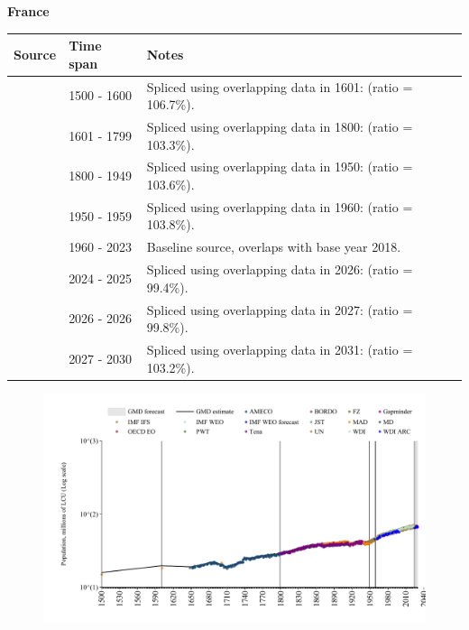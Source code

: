 \documentclass[12pt,a4paper,landscape]{article}
\begin{document}
\begin{adjustbox}{max totalsize={\paperwidth}{\paperheight},center}
\begin{minipage}[t][\textheight][t]{\textwidth}
\vspace*{0.5cm}
{}
\begin{center}
{\Large\bfseries France}
\end{center}
\vspace{0.5cm}
\begin{table}[H]
\centering
\small
\begin{tabular}{|l|l|l|}
\hline
\textbf{Source} & \textbf{Time span} & \textbf{Notes} \\
\hline
\rowcolor{white}\cite{MAD}& 1500 - 1600 &Spliced using overlapping data in 1601: (ratio = 106.7\%).\\
\rowcolor{lightgray}\cite{MD}& 1601 - 1799 &Spliced using overlapping data in 1800: (ratio = 103.3\%).\\
\rowcolor{white}\cite{Gapminder}& 1800 - 1949 &Spliced using overlapping data in 1950: (ratio = 103.6\%).\\
\rowcolor{lightgray}\cite{IMF_IFS}& 1950 - 1959 &Spliced using overlapping data in 1960: (ratio = 103.8\%).\\
\rowcolor{white}\cite{WDI}& 1960 - 2023 &Baseline source, overlaps with base year 2018.\\
\rowcolor{lightgray}\cite{OECD_EO}& 2024 - 2025 &Spliced using overlapping data in 2026: (ratio = 99.4\%).\\
\rowcolor{white}\cite{AMECO}& 2026 - 2026 &Spliced using overlapping data in 2027: (ratio = 99.8\%).\\
\rowcolor{lightgray}\cite{Gapminder}& 2027 - 2030 &Spliced using overlapping data in 2031: (ratio = 103.2\%).\\
\hline
\end{tabular}
\end{table}
\begin{figure}[H]
\centering
\includegraphics[width=\textwidth,height=0.6\textheight,keepaspectratio]{graphs/FRA_pop.pdf}
\end{figure}
\end{minipage}
\end{adjustbox}
\end{document}
